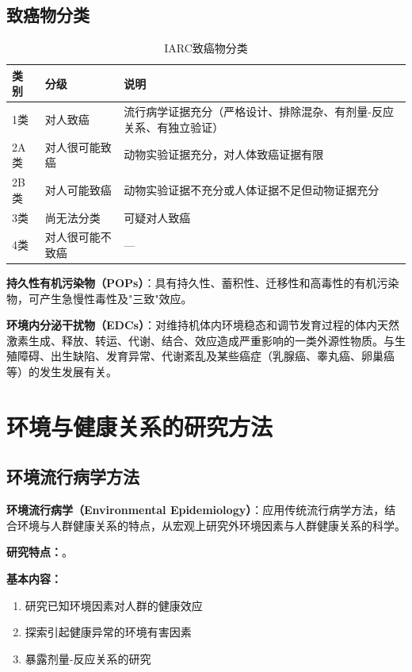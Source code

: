 \documentclass[10pt,a4paper,oneside]{ctexbook}
\begin{document}
\subsection{致癌物分类}

\begin{table}[htbp]
\centering
\caption{IARC致癌物分类}
\begin{tabularx}{\textwidth}{llX}
\hline
\textbf{类别} & \textbf{分级} & \textbf{说明} \\
\hline
1类 & 对人致癌 & 流行病学证据充分（严格设计、排除混杂、有剂量-反应关系、有独立验证）\\
2A类 & 对人很可能致癌 & 动物实验证据充分，对人体致癌证据有限 \\
2B类 & 对人可能致癌 & 动物实验证据不充分或人体证据不足但动物证据充分 \\
3类 & 尚无法分类 & 可疑对人致癌 \\
4类 & 对人很可能不致癌 & — \\
\hline
\end{tabularx}
\end{table}

\begin{defbox}
\textbf{持久性有机污染物（POPs）}：具有持久性、蓄积性、迁移性和高毒性的有机污染物，可产生急慢性毒性及"三致"效应。

\textbf{环境内分泌干扰物（EDCs）}：对维持机体内环境稳态和调节发育过程的体内天然激素生成、释放、转运、代谢、结合、效应造成严重影响的一类外源性物质。与生殖障碍、出生缺陷、发育异常、代谢紊乱及某些癌症（乳腺癌、睾丸癌、卵巢癌等）的发生发展有关。
\end{defbox}

\section{环境与健康关系的研究方法}

\subsection{环境流行病学方法}

\begin{keybox}
\textbf{环境流行病学（Environmental Epidemiology）}：应用传统流行病学方法，结合环境与人群健康关系的特点，从宏观上研究外环境因素与人群健康关系的科学。

\textbf{研究特点：}。

\textbf{基本内容：}
\begin{enumerate}[leftmargin=*]
    \item 研究已知环境因素对人群的健康效应
    \item 探索引起健康异常的环境有害因素
    \item 暴露剂量-反应关系的研究
\end{enumerate}
\end{keybox}
\end{document}
